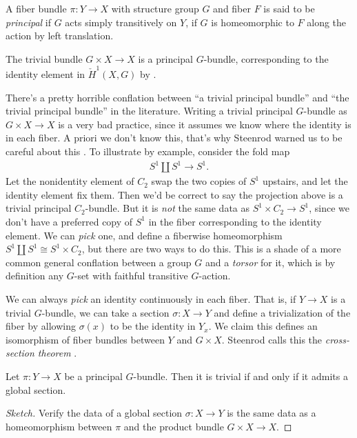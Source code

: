 \documentclass[11pt]{book}
\begin{document}
\begin{definition} A fiber bundle $\pi \colon Y \to X$ with structure group $G$ and fiber $F$ is said to be \emph{principal} if $G$ acts simply transitively on $Y$, if $G$ is homeomorphic to $F$ along the action by left translation.
\end{definition}

\begin{example} The trivial bundle $G \times X \to X$ is a principal $G$-bundle, corresponding to the identity element in $\check{H}^1(X,G)$ by .
\end{example}

\begin{remark} There's a pretty horrible conflation between ``a trivial principal bundle'' and ``the trivial principal bundle'' in the literature. Writing a trivial principal $G$-bundle as $G \times X \to X$ is a very bad practice, since it assumes we know where the identity is in each fiber. A priori we don't know this, that's why Steenrod warned us to be careful about this \cite[pp.37-38]{Steenrod-fibre-bundles}. To illustrate by example, consider the fold map
\begin{align*}
    S^1 \amalg S^1 \to S^1.
\end{align*}
Let the nonidentity element of $C_2$ swap the two copies of $S^1$ upstairs, and let the identity element fix them. Then we'd be correct to say the projection above is a trivial principal $C_2$-bundle. But it is \emph{not} the same data as $S^1 \times C_2 \to S^1$, since we don't have a preferred copy of $S^1$ in the fiber corresponding to the identity element. We can \emph{pick} one, and define a fiberwise homeomorphism $S^1 \amalg S^1 \cong S^1 \times C_2$, but there are two ways to do this. This is a shade of a more common general conflation between a group $G$ and a \emph{torsor} for it, which is by definition any $G$-set with faithful transitive $G$-action.
\end{remark}

We can always \emph{pick} an identity continuously in each fiber. That is, if $Y \to X$ is a trivial $G$-bundle, we can take a section $\sigma \colon X \to Y$ and define a trivialization of the fiber by allowing $\sigma(x)$ to be the identity in $Y_x$. We claim this defines an isomorphism of fiber bundles between $Y$ and $G \times X$. Steenrod calls this the \emph{cross-section theorem} \cite[I.8.3]{Steenrod-fibre-bundles}.

\begin{theorem}
\label{thm:cross-section}
Let $\pi \colon Y \to X$ be a principal $G$-bundle. Then it is trivial if and only if it admits a global section.
\end{theorem}
\begin{proof}[Sketch] Verify the data of a global section $\sigma \colon X \to Y$ is the same data as a homeomorphism between $\pi$ and the product bundle $G \times X \to X$.
\end{proof}
\end{document}
